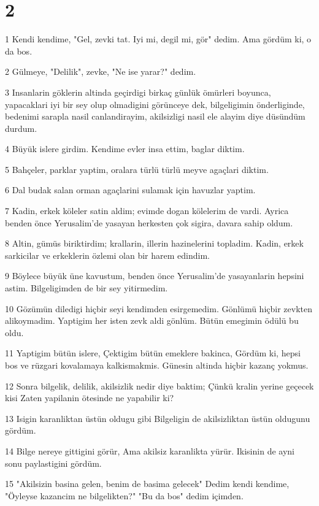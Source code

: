 \chapter{2}

\par 1 Kendi kendime, "Gel, zevki tat. Iyi mi, degil mi, gör" dedim. Ama gördüm ki, o da bos.
\par 2 Gülmeye, "Delilik", zevke, "Ne ise yarar?" dedim.
\par 3 Insanlarin göklerin altinda geçirdigi birkaç günlük ömürleri boyunca, yapacaklari iyi bir sey olup olmadigini görünceye dek, bilgeligimin önderliginde, bedenimi sarapla nasil canlandirayim, akilsizligi nasil ele alayim diye düsündüm durdum.
\par 4 Büyük islere girdim. Kendime evler insa ettim, baglar diktim.
\par 5 Bahçeler, parklar yaptim, oralara türlü türlü meyve agaçlari diktim.
\par 6 Dal budak salan orman agaçlarini sulamak için havuzlar yaptim.
\par 7 Kadin, erkek köleler satin aldim; evimde dogan kölelerim de vardi. Ayrica benden önce Yerusalim'de yasayan herkesten çok sigira, davara sahip oldum.
\par 8 Altin, gümüs biriktirdim; krallarin, illerin hazinelerini topladim. Kadin, erkek sarkicilar ve erkeklerin özlemi olan bir harem edindim.
\par 9 Böylece büyük üne kavustum, benden önce Yerusalim'de yasayanlarin hepsini astim. Bilgeligimden de bir sey yitirmedim.
\par 10 Gözümün diledigi hiçbir seyi kendimden esirgemedim. Gönlümü hiçbir zevkten alikoymadim. Yaptigim her isten zevk aldi gönlüm. Bütün emegimin ödülü bu oldu.
\par 11 Yaptigim bütün islere, Çektigim bütün emeklere bakinca, Gördüm ki, hepsi bos ve rüzgari kovalamaya kalkismakmis. Günesin altinda hiçbir kazanç yokmus.
\par 12 Sonra bilgelik, delilik, akilsizlik nedir diye baktim; Çünkü kralin yerine geçecek kisi Zaten yapilanin ötesinde ne yapabilir ki?
\par 13 Isigin karanliktan üstün oldugu gibi Bilgeligin de akilsizliktan üstün oldugunu gördüm.
\par 14 Bilge nereye gittigini görür, Ama akilsiz karanlikta yürür. Ikisinin de ayni sonu paylastigini gördüm.
\par 15 "Akilsizin basina gelen, benim de basima gelecek" Dedim kendi kendime, "Öyleyse kazancim ne bilgelikten?" "Bu da bos" dedim içimden.
